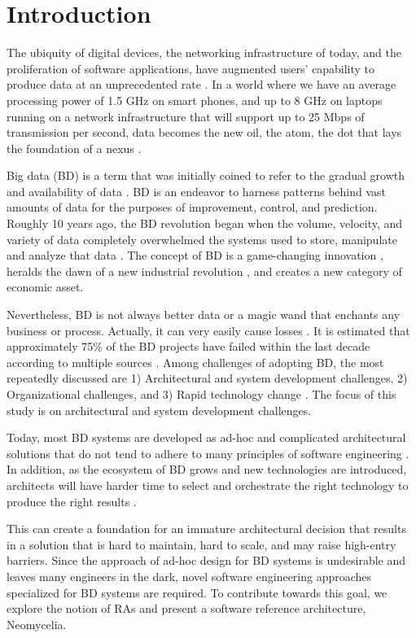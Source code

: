 \documentclass[10pt, conference]{IEEEtran}
\begin{document}
\section{Introduction}
The ubiquity of digital devices, the networking infrastructure of today, and the proliferation of software applications, have augmented users’ capability to produce data at an unprecedented rate \cite{AtaeiHype}. In a world where we have an average processing power of 1.5 GHz on smart phones, and up to 8 GHz on laptops running on a network infrastructure that will support up to 25 Mbps of transmission per second, data becomes the new oil, the atom, the dot that lays the foundation of a nexus \cite{Shafi}.

Big data (BD) is a term that was initially coined to refer to the gradual growth and availability of data \cite{lycett2013datafication}. BD is an endeavor to harness patterns behind vast amounts of data for the purposes of improvement, control, and prediction. Roughly 10 years ago, the BD revolution began when the volume, velocity, and variety of data completely overwhelmed the systems used to store, manipulate and analyze that data \cite{heudecker2014survey,AtaeiBigDataEnvirons}. The concept of BD is a game-changing innovation \cite{chen2017big}, heralds the dawn of a new industrial revolution \cite{Huberty}, and creates a new category of economic asset.

Nevertheless, BD is not always better data or a magic wand that enchants any business or process. Actually, it can very easily cause losses \cite{Ranjan}. It is estimated that approximately 75\% of the BD projects have failed within the last decade according to multiple sources \cite{Partners,analytics2016age,Nash,heudecker2014survey}. Among challenges of adopting BD, the most repeatedly discussed are 1) Architectural and system development challenges, 2) Organizational challenges, and 3) Rapid technology change \cite{chen2017big,AtaeiHype,Singh}. The focus of this study is on architectural and system development challenges.

Today, most BD systems are developed as ad-hoc and complicated architectural solutions that do not tend to adhere to many principles of software engineering \cite{Gorton,Nadal}. In addition, as the ecosystem of BD grows and new technologies are introduced, architects will have harder time to select and orchestrate the right technology to produce the right results \cite{Nadal}.

This can create a foundation for an immature architectural decision that results in a solution that is hard to maintain, hard to scale, and may raise high-entry barriers.  Since the approach of ad-hoc design for BD systems is undesirable and leaves many engineers in the dark, novel software engineering approaches specialized for BD systems are required. To contribute towards this goal, we explore the notion of RAs and present a software reference architecture, Neomycelia.
\end{document}
